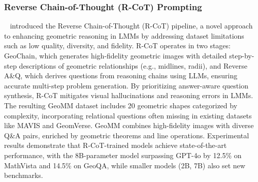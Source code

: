 \documentclass{article}
\begin{document}
\subsubsection{Reverse Chain-of-Thought (R-CoT) Prompting}
\label{R-CoT}
\noindent ~\cite{deng2024rcotreversechainofthoughtproblem} introduced the Reverse Chain-of-Thought (R-CoT) pipeline, a novel approach to enhancing geometric reasoning in LMMs by addressing dataset limitations such as low quality, diversity, and fidelity. R-CoT operates in two stages: GeoChain, which generates high-fidelity geometric images with detailed step-by-step descriptions of geometric relationships (e.g., midlines, radii), and Reverse A\&Q, which derives questions from reasoning chains using LLMs, ensuring accurate multi-step problem generation. By prioritizing answer-aware question synthesis, R-CoT mitigates visual hallucinations and reasoning errors in LMMs. The resulting GeoMM dataset includes 20 geometric shapes categorized by complexity, incorporating relational questions often missing in existing datasets like MAVIS and GeomVerse. GeoMM combines high-fidelity images with diverse Q\&A pairs, enriched by geometric theorems and line operations. Experimental results demonstrate that R-CoT-trained models achieve state-of-the-art performance, with the 8B-parameter model surpassing GPT-4o by 12.5\% on MathVista and 14.5\% on GeoQA, while smaller models (2B, 7B) also set new benchmarks.  
\end{document}
